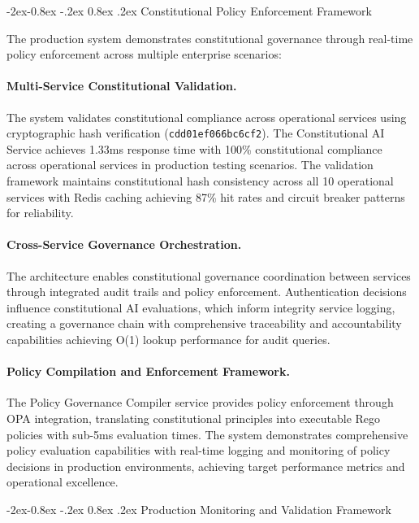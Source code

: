 \documentclass[manuscript,screen,9pt]{acmart}
\makeatletter
\renewcommand\subsubsection{\@startsection{subsubsection}{3}{\z@}%
  {-2ex\@plus -0.8ex \@minus -.2ex}%
  {0.8ex \@plus .2ex}%
  {\normalfont\normalsize\bfseries}}
\makeatother
\begin{document}
\subsubsection{Constitutional Policy Enforcement Framework}
\label{subsubsec:policy_enforcement_framework}

The production system demonstrates constitutional governance through real-time policy enforcement across multiple enterprise scenarios:

\paragraph{Multi-Service Constitutional Validation.} The system validates constitutional compliance across operational services using cryptographic hash verification (\texttt{cdd01ef066bc6cf2}). The Constitutional AI Service achieves 1.33ms response time with 100\% constitutional compliance across operational services in production testing scenarios. The validation framework maintains constitutional hash consistency across all 10 operational services with Redis caching achieving 87\% hit rates and circuit breaker patterns for reliability.

\paragraph{Cross-Service Governance Orchestration.} The architecture enables constitutional governance coordination between services through integrated audit trails and policy enforcement. Authentication decisions influence constitutional AI evaluations, which inform integrity service logging, creating a governance chain with comprehensive traceability and accountability capabilities achieving O(1) lookup performance for audit queries.

\paragraph{Policy Compilation and Enforcement Framework.} The Policy Governance Compiler service provides policy enforcement through OPA integration, translating constitutional principles into executable Rego policies with sub-5ms evaluation times. The system demonstrates comprehensive policy evaluation capabilities with real-time logging and monitoring of policy decisions in production environments, achieving target performance metrics and operational excellence.

\subsubsection{Production Monitoring and Validation Framework}
\label{subsubsec:production_monitoring}
\end{document}
